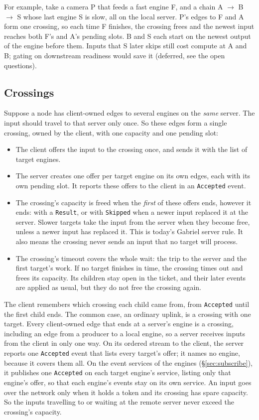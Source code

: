 \documentclass[11pt]{article}
\newcommand{\code}[1]{\texttt{#1}}
\begin{document}
For example, take a camera P that feeds a fast engine F, and a chain
A $\to$ B $\to$ S whose last engine S is slow, all on the local server. P's
edges to F and A form one crossing, so each time F finishes, the crossing
frees and the newest input reaches both F's and A's pending slots. B and S
each start on the newest output of the engine before them. Inputs that S
later skips still cost compute at A and B; gating on downstream readiness
would save it (deferred, see the open questions).

\subsection{Crossings}
\label{sec:crossing}

Suppose a node has client-owned edges to several engines on the \emph{same}
server. The input should travel to that server only once. So these edges form
a single crossing, owned by the client, with one capacity and one pending
slot:
\begin{itemize}[nosep]
  \item The client offers the input to the crossing once, and sends it with
        the list of target engines.
  \item The server creates one offer per target engine on its own edges, each
        with its own pending slot. It reports these offers to the
        client in an \code{Accepted} event.
  \item The crossing's capacity is freed when the \emph{first} of these
        offers ends, however it ends: with a \code{Result}, or with
        \code{Skipped} when a newer input replaced it at the server. Slower targets take the input from the server when they
        become free, unless a newer input has replaced it. This is today's
        Gabriel server rule. It also means the crossing never sends an input
        that no target will process.
  \item The crossing's timeout covers the whole wait: the trip to the server
        and the first target's work. If no target finishes in time, the
        crossing times out and frees its capacity. Its children stay open in
        the ticket, and their later events are applied as usual, but they do
        not free the crossing again.
\end{itemize}
The client remembers which crossing each child came from, from
\code{Accepted} until the first child ends.
The common case, an ordinary uplink, is a crossing with one target. Every
client-owned edge that ends at a server's engine is a crossing, including an
edge from a producer to a local engine, so a server receives inputs from the
client in only one way. On its ordered stream to the client, the server
reports one \code{Accepted} event that lists every target's offer; it names
no engine, because it covers them all. On the
event services of the engines (\S\ref{sec:subscribe}), it publishes one
\code{Accepted} on each target engine's service, listing only that engine's
offer, so that each engine's events stay on its own service. An input
goes over the network only when it holds a token and its crossing has spare
capacity. So the inputs travelling to or waiting at the remote server never
exceed the crossing's capacity.
\end{document}
